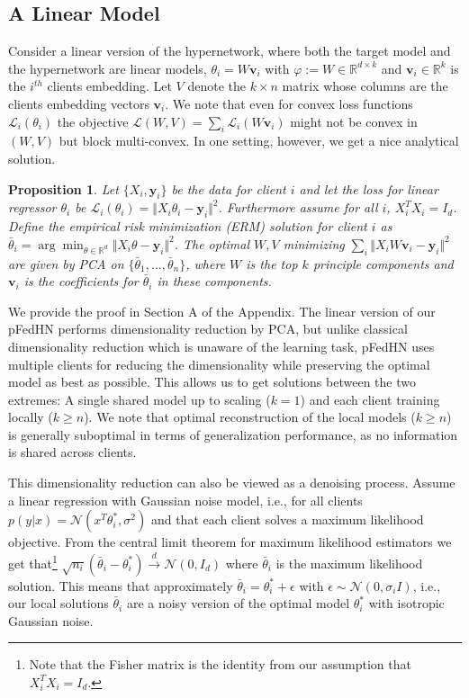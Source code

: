 \documentclass{article}
\def\gL{{\mathcal{L}}}
\def\sR{{\mathbb{R}}}
\newcommand{\bv}{\boldsymbol{v}}
\newcommand{\by}{\boldsymbol{y}}
\newtheorem{prop}{Proposition}
\newcommand\ourmethod{pFedHN}
\begin{document}
\subsection{A Linear Model}

Consider a linear version of the hypernetwork, where both the target model and the hypernetwork are linear models, $\theta_i=W\bv_i$ with $\varphi:=W\in \sR^{d\times k}$ and $\bv_i\in\sR^k$ is the $i^{th}$ clients embedding. Let $V$ denote the $k\times n$ matrix whose columns are the clients embedding vectors $\bv_i$. We note that even for convex loss functions $\gL_i(\theta_i)$ the objective $\gL(W,V)=\sum_i\gL_i(W\bv_i)$ might not be convex in $(W,V)$ but block multi-convex. In one setting, however, we get a nice analytical solution.

\begin{prop}
Let $\{X_i,\by_i\}$ be the data for client $i$ and let the loss for linear regressor $\theta_i$ be $\gL_i(\theta_i)=\Vert X_i\theta_i-\by_i\Vert^2$. Furthermore assume for all $i$, $X_i^TX_i=I_d$. Define the empirical risk minimization (ERM) solution for client $i$ as  $\bar{\theta}_i=\arg\min_{\theta\in\sR^d}\Vert X_i\theta-\by_i\Vert^2$. The optimal $W,V$ minimizing $\sum_i \Vert X_iW\bv_i-\by_i \Vert^2$ are given by PCA on $\{\bar{\theta}_1,...,\bar{\theta}_n\}$, where $W$ is the top $k$ principle components and $\bv_i$ is the coefficients for $\bar{\theta}_i$ in these components.
\end{prop}

We provide the proof in Section A of the Appendix. The linear version of our \ourmethod{} performs dimensionality reduction by PCA, but unlike classical dimensionality reduction which is unaware of the learning task, \ourmethod{} uses multiple clients for reducing the dimensionality while preserving the optimal model as best as possible. This allows us to get solutions between the two extremes: A single shared model up to scaling ($k=1$) and each client training locally ($k\geq n$). We note that optimal reconstruction of the local models ($k \geq n$) is generally suboptimal in terms of generalization performance, as no information is shared across clients.

This dimensionality reduction can also be viewed as a denoising process. Assume a linear regression with Gaussian noise model, i.e., for all clients  $p(y|x)=\mathcal{N}(x^T\theta_i^*,\sigma^2)$ and that each client solves a maximum likelihood objective. From the central limit theorem for maximum likelihood estimators \cite{CLT_for_ML} we get that\footnote{Note that the Fisher matrix is the identity from our assumption that $X_i^TX_i=I_d$.} $\sqrt{n_i}(\bar{\theta}_i-\theta^*_i)\overset{d}{\longrightarrow}\mathcal{N}(0,I_d)$ where $\bar{\theta}_i$ is the maximum likelihood solution. This means that approximately $\bar{\theta}_i=\theta^*_i+\epsilon$ with  $\epsilon\sim\mathcal{N}(0,\sigma_i I)$, i.e., our local solutions $\bar{\theta}_i$ are a noisy version of the optimal model $\theta^*_i$ with isotropic Gaussian noise.  
\end{document}
